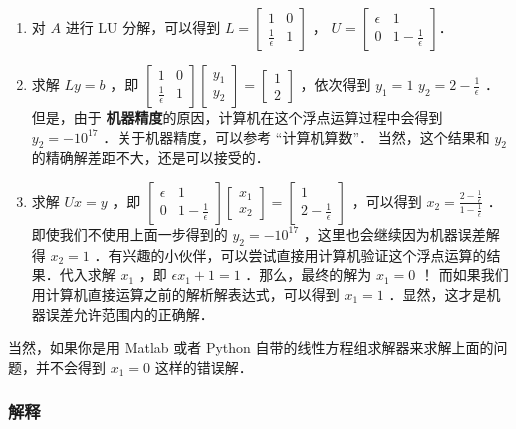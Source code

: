 \begin{enumerate}
\item 对  $A$  进行 LU 分解，可以得到  $L=\begin{bmatrix} 1& 0\\ \frac{1}{\epsilon} & 1 \end{bmatrix}$  ，  $U=\begin{bmatrix} \epsilon & 1\\ 0 & 1-\frac{1}{\epsilon} \end{bmatrix}$．
\item  求解  $Ly=b$  ，即  $\begin{bmatrix} 1& 0\\ \frac{1}{\epsilon} & 1 \end{bmatrix} \begin{bmatrix} y_1\\ y_2 \end{bmatrix}= \begin{bmatrix} 1\\ 2 \end{bmatrix}$  ，依次得到  $y_1=1$   $y_2=2-\frac{1}{\epsilon}$  ．但是，由于	\textbf{机器精度}的原因，计算机在这个浮点运算过程中会得到  $y_2=-10^{17}$  ．关于机器精度，可以参考 “计算机算数”． 当然，这个结果和  $y_2$  的精确解差距不大，还是可以接受的．
\item 求解  $Ux=y$  ，即  $\begin{bmatrix} \epsilon& 1\\ 0 &1-\frac{1}{\epsilon}  \end{bmatrix} \begin{bmatrix} x_1\\ x_2 \end{bmatrix}= \begin{bmatrix} 1\\ 2-\frac{1}{\epsilon} \end{bmatrix}$  ，可以得到  $x_2=\frac{2-\frac{1}{\epsilon}}{1-\frac{1}{\epsilon}}$  ．即使我们不使用上面一步得到的  $y_2=-10^{17}$  ，这里也会继续因为机器误差解得  $x_2=1$  ．有兴趣的小伙伴，可以尝试直接用计算机验证这个浮点运算的结果．代入求解  $x_1$  ，即  $\epsilon x_1+1=1$  ．那么，最终的解为  $x_1=0$ ！ 而如果我们用计算机直接运算之前的解析解表达式，可以得到  $x_1=1$  ．显然，这才是机器误差允许范围内的正确解．
\end{enumerate}

当然，如果你是用 Matlab 或者 Python 自带的线性方程组求解器来求解上面的问题，并不会得到  $x_1=0$  这样的错误解．

\subsubsection{解释}

